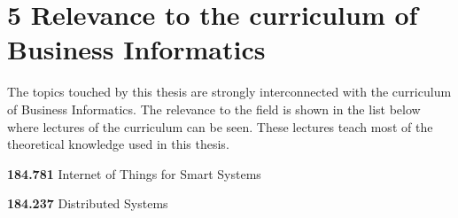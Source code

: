 \documentclass[draft,final,openany,oneside]{vutinfth} %
\begin{document}
\chapter {5 Relevance to the curriculum of Business Informatics}

The topics touched by this thesis are strongly interconnected with the curriculum of Business Informatics. The relevance to the field is shown in the list below where lectures of the curriculum can be seen. These lectures teach most of the theoretical knowledge used in this thesis.  

\textbf{184.781} Internet of Things for Smart Systems 

\textbf{184.237} Distributed Systems

\backmatter




\printindex




\end{document}
